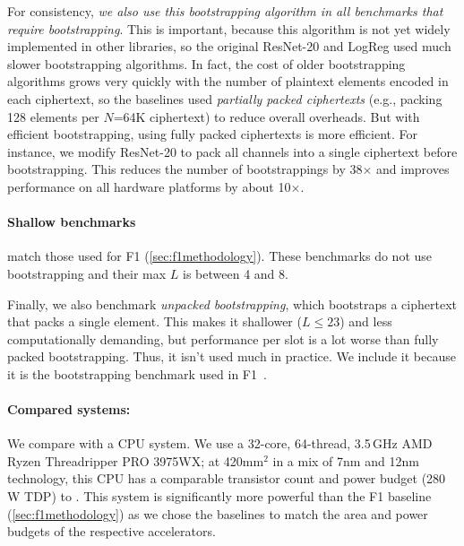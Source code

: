 For consistency, \emph{we also use this bootstrapping algorithm in all benchmarks that require bootstrapping}.
This is important, because this algorithm is not yet widely implemented in other libraries,
so the original ResNet-20 and LogReg used much slower bootstrapping algorithms.
In fact, the cost of older bootstrapping algorithms grows very quickly with the number of plaintext elements
encoded in each ciphertext, so the baselines used \emph{partially packed ciphertexts}
(e.g., packing 128 elements per $N$=64K ciphertext) to reduce overall overheads.
But with efficient bootstrapping, using fully packed ciphertexts is more efficient.
For instance, we modify ResNet-20 to pack all channels into a single 
ciphertext before bootstrapping. This reduces the number of bootstrappings by 38$\times$ %
and improves performance on all hardware platforms by about 10$\times$. 

\paragraph{Shallow benchmarks} match those used for F1 (\autoref{sec:f1methodology}). These benchmarks do not use bootstrapping and their max $L$ is between 4 and 8.

Finally, we also benchmark \emph{unpacked bootstrapping}, which bootstraps a
ciphertext that packs a single element. This makes it shallower ($L{\leq}23$)
and less computationally demanding, but performance per slot is a lot worse
than fully packed bootstrapping. Thus, it isn't used much in practice. We
include it because it is the bootstrapping benchmark used in
F1~\cite{feldmann:micro21:f1}.


\paragraph{Compared systems:}
We compare \name with a CPU system. 
We use a 32-core, 64-thread, 3.5\,GHz AMD Ryzen Threadripper PRO 3975WX;
at 420mm$^2$ in a mix of 7nm and 12nm technology, this CPU has a comparable
transistor count and power budget (280\,W TDP) to \name.
This system is significantly more powerful than the F1 baseline (\autoref{sec:f1methodology}) as
we chose the baselines to match the area and power budgets of the respective accelerators.


